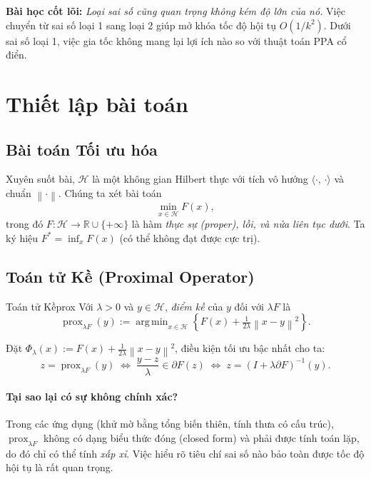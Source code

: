 \documentclass[12pt, a4paper]{article}
\newcommand{\HH}{\mathcal{H}}
\newcommand{\prox}{\operatorname{prox}}
\newcommand{\norm}[1]{\left\|#1\right\|}
\newcommand{\inner}[2]{\langle #1,\,#2\rangle}
\newcommand{\R}{\mathbb{R}}
\DeclareMathOperator*{\argmin}{arg\,min}
\begin{document}
\begin{keyidea}
\textbf{Bài học cốt lõi:}
\emph{Loại sai số cũng quan trọng không kém độ lớn của nó.}
Việc chuyển từ sai số loại 1 sang loại 2 giúp mở khóa tốc độ hội tụ $O(1/k^2)$.
Dưới sai số loại 1, việc gia tốc không mang lại lợi ích nào so với thuật toán PPA cổ điển.
\end{keyidea}

\section{Thiết lập bài toán}

\subsection{Bài toán Tối ưu hóa}

Xuyên suốt bài, $\HH$ là một không gian Hilbert thực với tích vô hướng $\inner{\cdot}{\cdot}$
và chuẩn $\norm{\cdot}$.
Chúng ta xét bài toán
\begin{equation}\label{eq:P}
  \min_{x\in\HH} F(x),
\end{equation}
trong đó $F:\HH\to\R\cup\{+\infty\}$ là hàm \emph{thực sự (proper), lồi,
và nửa liên tục dưới}.
Ta ký hiệu $F^*=\inf_x F(x)$ (có thể không đạt được cực trị).

\subsection{Toán tử Kề (Proximal Operator)}

\begin{definition}{Toán tử Kề}{prox}
Với $\lambda>0$ và $y\in\HH$, \emph{điểm kề} của $y$ đối với $\lambda F$ là
\[
  \prox_{\lambda F}(y)
  := \argmin_{x\in\HH}\!\left\{F(x)+\tfrac{1}{2\lambda}\norm{x-y}^2\right\}.
\]
\end{definition}

Đặt $\Phi_\lambda(x):=F(x)+\frac{1}{2\lambda}\norm{x-y}^2$,
điều kiện tối ưu bậc nhất cho ta:
\begin{equation}\label{eq:prox-equiv}
  z=\prox_{\lambda F}(y)
  \;\Longleftrightarrow\;
  \frac{y-z}{\lambda}\in\partial F(z)
  \;\Longleftrightarrow\;
  z=(I+\lambda\partial F)^{-1}(y).
\end{equation}

\paragraph{Tại sao lại có sự không chính xác?}
Trong các ứng dụng (khử mờ bằng tổng biến thiên, tính thưa có cấu trúc),
$\prox_{\lambda F}$ không có dạng biểu thức đóng (closed form) và phải được tính toán lặp,
do đó chỉ có thể tính \emph{xấp xỉ}. Việc hiểu rõ tiêu chí sai số nào bảo toàn được tốc độ hội tụ là rất quan trọng.
\end{document}
